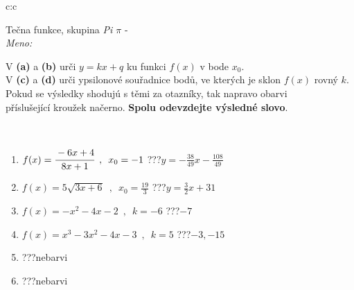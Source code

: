 \documentclass[10pt]{report}
\begin{document}
\newpage
\thispagestyle{empty}
\begin{tabular}{c:c}
\begin{minipage}[c][104.5mm][t]{0.5\linewidth}
\begin{center}
\vspace{7mm}
{\huge Tečna funkce, skupina \textit{Pi $\pi$} -}\\[5mm]
\textit{Meno:}\phantom{xxxxxxxxxxxxxxxxxxxxxxxxxxxxxxxxxxxxxxxxxxxxxxxxxxxxxxxxxxxxxxxxx}\\[5mm]
\begin{minipage}{0.95\linewidth}
\begin{center}
V \textbf{(a)} a \textbf{(b)} urči  $y = kx + q$ ku funkci $f(x)$ v bode $x_0$.\\V \textbf{(c)} a \textbf{(d)} urči ypsilonové souřadnice bodů, ve kterých je sklon $f(x)$ rovný $k$.\\Pokud se výsledky shodujú s těmi za otazníky, tak napravo obarvi\\příslušející kroužek načerno. \textbf{Spolu odevzdejte výsledné slovo}.
\end{center}
\end{minipage}
\\[1mm]
\begin{minipage}{0.79\linewidth}
\begin{center}
\begin{varwidth}{\linewidth}
\begin{enumerate}
\small
\item $f(x)=\cfrac{-6x+4}{8x+1}\enspace , \enspace x_0=-1$\quad \dotfill\; ???\;\dotfill \quad $y = -\frac{38}{49}x-\frac{108}{49}$
\item $f(x)=5\sqrt{3x+6}\enspace , \enspace x_0=\frac{19}{3}$\quad \dotfill\; ???\;\dotfill \quad $y = \frac{3}{2}x+31$
\item $f(x)=-x^2-4x-2\enspace , \enspace k=-6$\quad \dotfill\; ???\;\dotfill \quad $-7$
\item $f(x)=x^3-3x^2-4x-3\enspace , \enspace k=5$\quad \dotfill\; ???\;\dotfill \quad $-3 , -15$
\item \quad \dotfill\; ???\;\dotfill \quad nebarvi
\item \quad \dotfill\; ???\;\dotfill \quad nebarvi
\end{enumerate}
\end{varwidth}
\end{center}
\end{minipage}
\begin{minipage}{0.20\linewidth}

\end{minipage}
\end{center}
\end{minipage}
\end{tabular}
\end{document}

